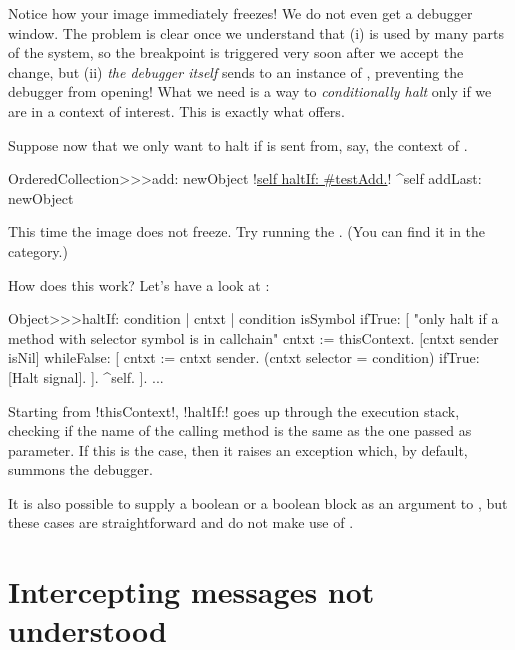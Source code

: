 \documentclass[a4paper,10pt,twoside]{book}
\begin{document}
{Notice how your image immediately freezes!  We do not even get a debugger window.
The problem is clear once we understand that (i)  is used by many parts of the system, so the breakpoint is triggered very soon after we accept the change, but (ii) \emph{the debugger itself} sends  to an instance of , preventing the debugger from opening!
What we need is a way to \emph{conditionally halt} only if we are in a context of interest.
This is exactly what  offers.

Suppose now that we only want to halt if  is sent from, say, the context of .

\begin{code}{}
OrderedCollection>>>add: newObject
	!\underline{self haltIf: \#testAdd.}!
	^self addLast: newObject
\end{code}

This time the image does not freeze. Try running the .
(You can find it in the  category.)

How does this work?  Let's have a look at :
\begin{code}{}
Object>>>haltIf: condition
	| cntxt |
	condition isSymbol ifTrue: [
		"only halt if a method with selector symbol is in callchain"
		cntxt := thisContext.
		[cntxt sender isNil] whileFalse: [
			cntxt := cntxt sender. 
			(cntxt selector = condition) ifTrue: [Halt signal]. ].
		^self.
	].
	...
\end{code}

Starting from \ct!thisContext!, \ct!haltIf:! goes up through the execution stack, checking if the name of the calling method is the same as the one passed as parameter.
If this is the case, then it raises an exception which, by default, summons the debugger.

It is also possible to supply a boolean or a boolean block as an argument to , but these cases are straightforward and do not make use of .

\section{Intercepting messages not understood}

}
\end{document}
